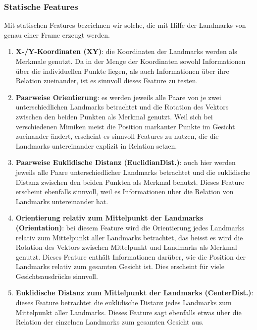 \subsubsection{Statische Features}
Mit statischen Features bezeichnen wir solche, die mit Hilfe der Landmarks von genau einer Frame erzeugt werden.
\begin{enumerate}
  \item \textbf{X-/Y-Koordinaten (XY)}: die Koordinaten der Landmarks werden als Merkmale genutzt. Da in der Menge der Koordinaten sowohl Informationen
        über die individuellen Punkte liegen, als auch Informationen über ihre Relation zueinander, ist es sinnvoll dieses Feature zu testen.

    \item \textbf{Paarweise Orientierung}: es werden jeweils alle Paare von je zwei unterschiedlichen Landmarks betrachtet und die Rotation des Vektors zwischen
        den beiden Punkten als Merkmal genutzt. Weil sich bei verschiedenen Mimiken meist die Position markanter Punkte im Gesicht zueinander ändert, erscheint es sinnvoll
        Features zu nutzen, die die Landmarks untereinander explizit in Relation setzen.

      \item \textbf{Paarweise Euklidische Distanz (EuclidianDist.)}: auch hier werden jeweils alle Paare unterschiedlicher Landmarks betrachtet und die euklidische Distanz zwischen
        den beiden Punkten als Merkmal benutzt. Dieses Feature erscheint ebenfalls sinnvoll, weil es Informationen über die Relation von Landmarks untereinander hat.

      \item \textbf{Orientierung relativ zum Mittelpunkt der Landmarks (Orientation)}: bei diesem Feature wird die Orientierung jedes Landmarks relativ zum Mittelpunkt aller Landmarks betrachtet,
        das heisst es wird die Rotation des Vektors zwischen Mittelpunkt und Landmarks als Merkmal genutzt. Dieses Feature enthält Informationen darüber, wie die Position der Landmarks relativ
        zum gesamten Gesicht ist. Dies erscheint für viele Gesichtsausdrücke sinnvoll.

      \item \textbf{Euklidische Distanz zum Mittelpunkt der Landmarks (CenterDist.)}: dieses Feature betrachtet die euklidische Distanz jedes Landmarks zum Mittelpunkt aller Landmarks. Dieses Feature sagt ebenfalls
        etwas über die Relation der einzelnen Landmarks zum gesamten Gesicht aus.


\end{enumerate}
